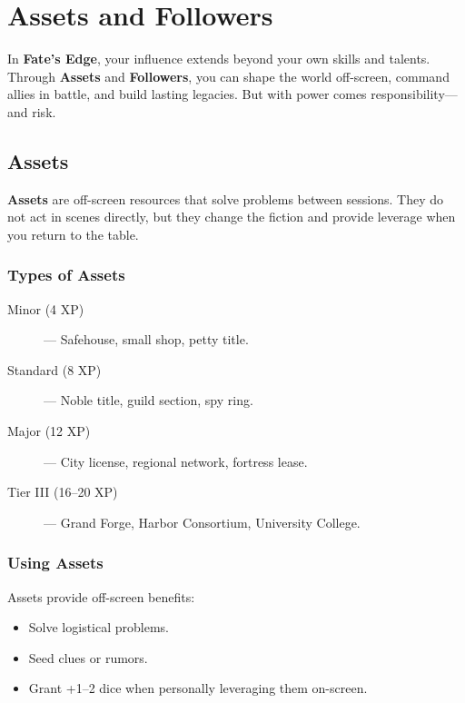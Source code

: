 
\chapter{Assets and Followers}

In \textbf{Fate’s Edge}, your influence extends beyond your own skills and talents. Through \textbf{Assets} and \textbf{Followers}, you can shape the world off-screen, command allies in battle, and build lasting legacies. But with power comes responsibility—and risk.

\section{Assets}

\textbf{Assets} are off-screen resources that solve problems between sessions. They do not act in scenes directly, but they change the fiction and provide leverage when you return to the table.

\subsection*{Types of Assets}

\begin{description}
  \item[Minor (4 XP)] — Safehouse, small shop, petty title.
  \item[Standard (8 XP)] — Noble title, guild section, spy ring.
  \item[Major (12 XP)] — City license, regional network, fortress lease.
  \item[Tier III (16–20 XP)] — Grand Forge, Harbor Consortium, University College.
\end{description}

\subsection*{Using Assets}

Assets provide off-screen benefits:

\begin{itemize}
  \item Solve logistical problems.
  \item Seed clues or rumors.
  \item Grant +1–2 dice when personally leveraging them on-screen.
\end{itemize}

